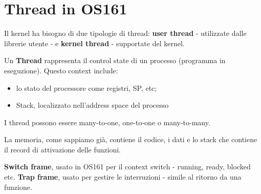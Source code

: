 \section{Thread in OS161}





Il kernel ha bisogno di due tipologie di thread:
\textbf{user thread} - utilizzate dalle librerie utente -  e \textbf{kernel thread} -
supportate del kernel.

Un \textbf{Thread} rappresenta il control state di un processo (programma in eseguzione).
Questo context include:
\begin{itemize}
  \item lo stato del processore come registri, SP, etc;
  \item Stack, localizzato nell'address space del processo
\end{itemize}

I thread possono essere many-to-one, one-to-one o many-to-many.

La memoria, come sappiamo già, contiene il codice, i dati e lo stack che contiene il
record di attivazione delle funzioni.


\textbf{Switch frame}, usato in OS161 per il context switch - running, ready, blocked etc.
\textbf{Trap frame}, usato per gestire le interruzioni - simile al ritorno da una funzione.



